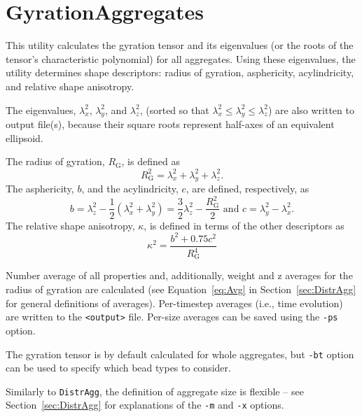\section{GyrationAggregates} \label{sec:GyrationAggregates}

This utility calculates the gyration tensor and its eigenvalues (or the
roots of the tensor's characteristic polynomial) for all aggregates. Using
these eigenvalues, the utility determines shape descriptors:
radius of gyration, asphericity, acylindricity, and relative shape
anisotropy.

The eigenvalues, $\lambda_x^2$, $\lambda_y^2$, and $\lambda_z^2$, (sorted
so that $\lambda_x^2\leq\lambda_y^2\leq\lambda_z^2$) are also written to
output file(s), because their square roots represent half-axes of an
equivalent ellipsoid.

The radius of gyration, $R_{\mathrm{G}}$, is defined as
\begin{equation} \label{eq:R_G}
  R_{\mathrm{G}}^2 = \lambda_x^2 + \lambda_y^2 + \lambda_z^2.
\end{equation}
The asphericity, $b$, and the acylindricity, $c$, are defined,
respectively, as
\begin{equation} \label{eq:b}
  b= \lambda_z^2 - \frac{1}{2}(\lambda_x^2 + \lambda_y^2) =
    \frac{3}{2}\lambda_z^2 - \frac{R_{\mathrm{G}}^2}{2}
  \mbox{ \ \ and \ \ }
  c = \lambda_y^2 - \lambda_x^2.
\end{equation}
The relative shape anisotropy, $\kappa$, is defined in terms of the other
descriptors as
\begin{equation} \label{eq:anis}
  \kappa^2 = \frac{b^2 + 0.75 c^2}{R_{\mathrm{G}}^4}
\end{equation}

Number average of all properties and, additionally, weight and z averages
for the radius of gyration are calculated (see Equation~\eqref{eq:Avg} in
Section~\ref{sec:DistrAgg} for general definitions of averages).
Per-timestep averages (i.e., time evolution) are written to the
\texttt{<output>} file. Per-size averages can be saved using the
\texttt{-ps} option.

The gyration tensor is by default calculated for whole aggregates, but
\texttt{-bt} option can be used to specify which bead types to consider.

Similarly to \texttt{DistrAgg}, the definition of aggregate size is
flexible -- see Section~\ref{sec:DistrAgg} for explanations of the
\texttt{-m} and \texttt{-x} options.

